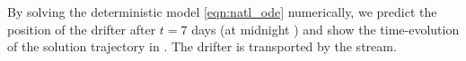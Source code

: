 By solving the deterministic model \cref{eqn:natl_ode} numerically, we predict the position of the drifter after \(t = 7\) days (at midnight ) and show the time-evolution of the solution trajectory in .
The drifter is transported by the stream.













